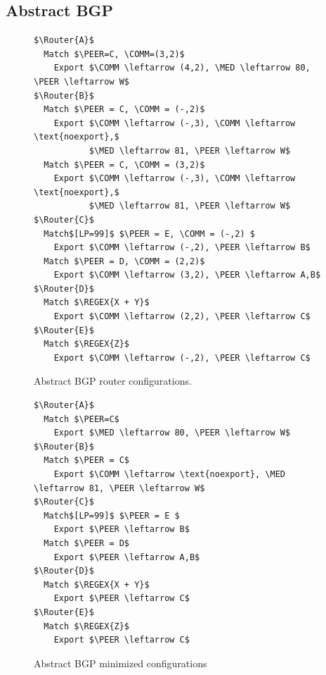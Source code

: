 \subsection{Abstract BGP}


\newcommand{\Router}[1]{ \textbf{Router #1:} }
\newcommand{\REGEX}[1]{ \text{regex}(#1) }
\newcommand{\PEER}{ \text{peer} }
\newcommand{\COMM} {\text{comm}}
\newcommand{\MED} {\text{MED}}

\begin{figure}[t!]
\begin{lstlisting}[frame=single, mathescape=true] 
$\Router{A}$
  Match $\PEER=C, \COMM=(3,2)$
    Export $\COMM \leftarrow (4,2), \MED \leftarrow 80, \PEER \leftarrow W$
$\Router{B}$
  Match $\PEER = C, \COMM = (-,2)$
    Export $\COMM \leftarrow (-,3), \COMM \leftarrow \text{noexport},$ 
           $\MED \leftarrow 81, \PEER \leftarrow W$
  Match $\PEER = C, \COMM = (3,2)$
    Export $\COMM \leftarrow (-,3), \COMM \leftarrow \text{noexport},$ 
           $\MED \leftarrow 81, \PEER \leftarrow W$
$\Router{C}$
  Match$[LP=99]$ $\PEER = E, \COMM = (-,2) $
    Export $\COMM \leftarrow (-,2), \PEER \leftarrow B$
  Match $\PEER = D, \COMM = (2,2)$
    Export $\COMM \leftarrow (3,2), \PEER \leftarrow A,B$
$\Router{D}$
  Match $\REGEX{X + Y}$
    Export $\COMM \leftarrow (2,2), \PEER \leftarrow C$
$\Router{E}$
  Match $\REGEX{Z}$
    Export $\COMM \leftarrow (-,2), \PEER \leftarrow C$
\end{lstlisting}
\label{fig:config}
\caption{Abstract BGP router configurations.}
\end{figure}


\begin{figure}[t!]
\begin{lstlisting}[frame=single, mathescape=true] 
$\Router{A}$
  Match $\PEER=C$
    Export $\MED \leftarrow 80, \PEER \leftarrow W$
$\Router{B}$
  Match $\PEER = C$
    Export $\COMM \leftarrow \text{noexport}, \MED \leftarrow 81, \PEER \leftarrow W$
$\Router{C}$
  Match$[LP=99]$ $\PEER = E $
    Export $\PEER \leftarrow B$
  Match $\PEER = D$
    Export $\PEER \leftarrow A,B$
$\Router{D}$
  Match $\REGEX{X + Y}$
    Export $\PEER \leftarrow C$
$\Router{E}$
  Match $\REGEX{Z}$
    Export $\PEER \leftarrow C$
\end{lstlisting}
\label{fig:config-min}
\caption{Abstract BGP minimized configurations}
\end{figure}

